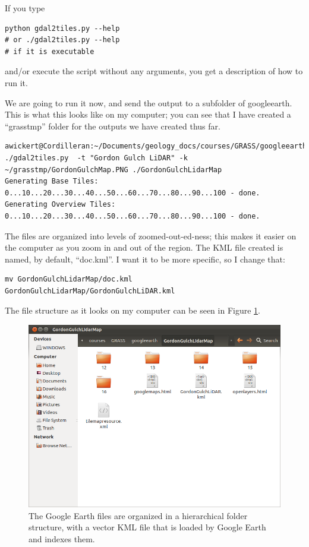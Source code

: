 \documentclass{book}
\begin{document}
If you type
\begin{lstlisting}
python gdal2tiles.py --help
# or ./gdal2tiles.py --help
# if it is executable
\end{lstlisting}
and/or execute the script without any arguments, you get a description of how to run it.

We are going to run it now, and send the output to a subfolder of googleearth. This is what this looks like on my computer; you can see that I have created a ``grasstmp'' folder for the outputs we have created thus far.
\begin{lstlisting}
awickert@Cordilleran:~/Documents/geology_docs/courses/GRASS/googleearth$ ./gdal2tiles.py  -t "Gordon Gulch LiDAR" -k ~/grasstmp/GordonGulchMap.PNG ./GordonGulchLidarMap
Generating Base Tiles:
0...10...20...30...40...50...60...70...80...90...100 - done.
Generating Overview Tiles:
0...10...20...30...40...50...60...70...80...90...100 - done.
\end{lstlisting}

The files are organized into levels of zoomed-out-ed-ness; this makes it easier on the computer as you zoom in and out of the region. The KML file created is named, by default, ``doc.kml''. I want it to be more specific, so I change that:
\begin{lstlisting}
mv GordonGulchLidarMap/doc.kml GordonGulchLidarMap/GordonGulchLiDAR.kml
\end{lstlisting}
The file structure as it looks on my computer can be seen in Figure \ref{fig:GoogleEarthLiDAR_file_structure}.

\begin{figure}[h]
 \begin{center}
 \includegraphics[width=.9\linewidth]{figures/ubuntu/GoogleEarthLiDAR_file_structure.png}
 \caption{The Google Earth files are organized in a hierarchical folder structure, with a vector KML file that is loaded by Google Earth and indexes them.}
 \label{fig:GoogleEarthLiDAR_file_structure}
 \end{center}
\end{figure}
\end{document}
